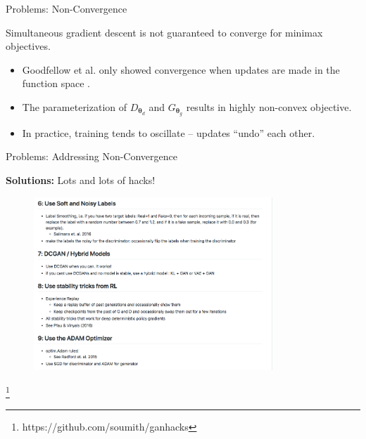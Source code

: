 \documentclass[notheorems]{beamer}
\newcommand{\source}[1]{{\let\thefootnote\relax\footnote{{\tiny #1}}}}
\newcommand{\vtheta}{\mathbf{\theta}}
\begin{document}
    \begin{frame}{Problems: Non-Convergence}

        Simultaneous gradient descent is not guaranteed to converge for minimax objectives.
        \begin{itemize}
            \item Goodfellow et al. only showed convergence when updates are made in the function space \cite{goodfellow2014generative}.
            \item The parameterization of $D_{\vtheta_d}$ and $G_{\vtheta_g}$ results in highly non-convex objective.
            \item In practice, training tends to oscillate -- updates ``undo'' each other.
        \end{itemize}
    \end{frame}

    \begin{frame}{Problems: Addressing Non-Convergence}

        \textbf{Solutions: } Lots and lots of hacks!

        \begin{figure}
            \centering
            \includegraphics[width=0.8\textwidth]{figures/hacks}
        \end{figure}

        \source{https://github.com/soumith/ganhacks}

    \end{frame}
\end{document}
